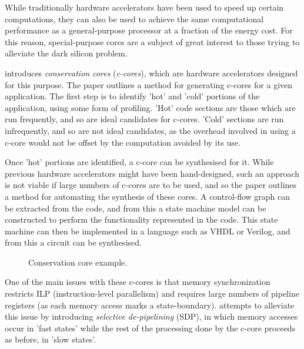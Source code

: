 \documentclass{UoYCSproject}
\begin{document}
While traditionally hardware accelerators have been used to speed up certain computations, they can also be used to achieve the
same computational performance as a general-purpose processor at a fraction of the energy cost. For this reason,
special-purpose cores are a subject of great interest to those trying to alleviate the dark silicon problem.

\cite{c-cores} introduces \textit{conservation cores} (\textit{c-cores}), which are hardware accelerators
designed for this purpose. The paper outlines a method for generating c-cores for a given application.
The first step is to identify 'hot' and 'cold' portions of the application, using some form of profiling.
'Hot' code sections are those which are run frequently, and so are ideal candidates for c-cores. 'Cold' sections
are run infrequently, and so are not ideal candidates, as the overhead involved in using a c-core would
not be offset by the computation avoided by its use.

Once 'hot' portions are identified, a c-core can be synthesised for it. While previous hardware accelerators
might have been hand-designed, such an approach is not viable if large numbers of c-cores are to be used, and so
the paper outlines a method for automating the synthesis of these cores. A control-flow graph can be extracted
from the code, and from this a state machine model can be constructed to perform the functionality represented
in the code. This state machine can then be implemented in a language such as VHDL or Verilog, and from this a circuit
can be synthesised.

\begin{figure}[h]
\caption{Conservation core example. \cite{c-cores}}
\end{figure}

One of the main issues with these c-cores is that memory synchronization restricts ILP (instruction-level parallelism)
and requires large numbers of pipeline registers (as each memory access marks a state-boundary). \cite{eco-cores} attempts
to alleviate this issue by introducing \textit{selective de-pipelining} (SDP), in which memory accesses occur in 'fast states'
while the rest of the processing done by the c-core proceeds as before, in 'slow states'.
\end{document}
